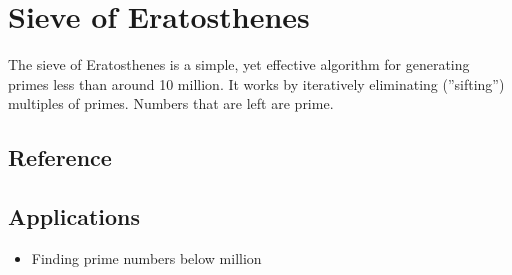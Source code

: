 \section{Sieve of Eratosthenes}
The sieve of Eratosthenes is a simple, yet effective algorithm for generating primes less than around 10 million.
It works by iteratively eliminating (''sifting'') multiples of primes.
Numbers that are left are prime.

\subsection{Reference}


\subsection{Applications}
\begin{itemize}
	\item	Finding prime numbers below  million
\end{itemize}
